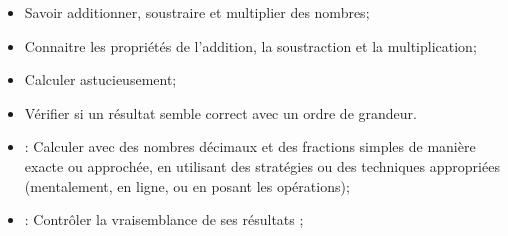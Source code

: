 \begin{myobj}
	\begin{itemize}
		\item Savoir additionner, soustraire et multiplier des nombres;
		\item Connaitre les propriétés de l’addition, la soustraction et la multiplication;
		\item Calculer astucieusement;
		\item Vérifier si un résultat semble correct avec un ordre de grandeur.
	\end{itemize}
\end{myobj}

\begin{mycomp}
	\begin{itemize}
		\item {} : Calculer avec des nombres décimaux et des fractions simples de manière exacte ou approchée, en utilisant des stratégies ou des techniques appropriées (mentalement, en ligne, ou en posant les opérations); 
		\item {} : Contrôler la vraisemblance de ses résultats ; 
	\end{itemize}
\end{mycomp}